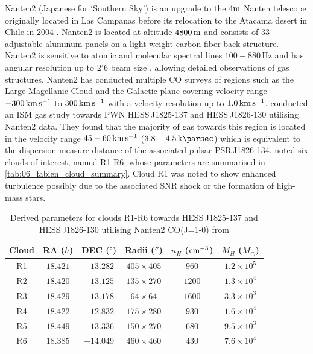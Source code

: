 Nanten2 (Japanese for `Southern Sky') is an upgrade to the $4\si{\meter}$ Nanten telescope originally located in Las Campanas before its relocation to the Atacama desert in Chile in 2004 \citep{2006IAUSS...1E..21F}. Nanten2 is located at altitude $4800\,\si{\meter}$ and consists of 33 adjustable aluminum panels on a light-weight carbon fiber back structure. Nanten2 is sensitive to atomic and molecular spectral lines  $100-880\,\si{\hertz}$ and has angular resolution up to $2'6$ beam size \citep{2001PASJ...53L..45M}, allowing detailed observations of gas structures. Nanten2 has conducted multiple CO surveys of regions such as the Large Magellanic Cloud \citep{Kawamura_2009} and the Galactic plane \citep{2004ASPC..317...59M} covering velocity range $-300\,\si{\kilo\meter\per\second}$ to $300\,\si{\kilo\meter\per\second}$ with a velocity resolution up to $1.0\,\si{\kilo\meter\per\second}$.
\newpar
\cite{2016MNRAS.458.2813V} conducted an ISM gas study towards PWN \mbox{HESS\,J1825-137} and \mbox{HESS\,J1826-130} utilising Nanten2 data. They found that the majority of gas towards this region is located in the velocity range $45-60\,\si{\kilo\meter\per\second}$ ($3.8-4.5\,\kpc$) which is equivalent to the dispersion measure distance of the associated pulsar \mbox{PSR\,J1826-134}. \cite{2016MNRAS.458.2813V} noted six clouds of interest, named R1-R6, whose parameters are summarised in \autoref{tab:06_fabien_cloud_summary}. Cloud R1 was noted to show enhanced turbulence possibly due to the associated SNR shock or the formation of high-mass stars.
\begin{table}[h!]
    \caption{Derived parameters for clouds R1-R6 towards \mbox{HESS\,J1825-137} and \mbox{HESS\,J1826-130} utilising Nanten2 CO(J=1-0) from \cite{2016MNRAS.458.2813V}}
    \begin{threeparttable}
    \centering
    \begin{tabular}{cccccc}
        \toprule
        Cloud & RA ($\si{h}$) & DEC ($\si{\degree}$)& Radii ($''$) & $n_H$ ($\si{\per\centi\meter\cubed}$) & $M_H$ ($M_\odot$) \\
        \midrule
        R1 & $18.421$ & $-13.282$ & $405\times 405$ & $960$ & $1.2\times 10^5$ \\
        R2 & $18.420$ & $-13.125$ & $135\times 270$ & $1200$ & $1.3\times 10^4$ \\
        R3 & $18.429$ & $-13.178$ & $64\times 64$ & $1600$ & $3.3\times 10^3$ \\
        R4 & $18.422$ & $-12.832$ & $175\times 280$ & $930$ & $1.6\times 10^4$ \\
        R5 & $18.449$ & $-13.336$ & $150\times 270$ & $680$ & $9.5\times 10^3$  \\
        R6 & $18.385$ & $-14.049$ & $460\times 460$ & $430$  & $7.6\times 10^4$ \\
        \bottomrule
    \end{tabular}
    \end{threeparttable}
    \label{tab:06_fabien_cloud_summary}
\end{table}